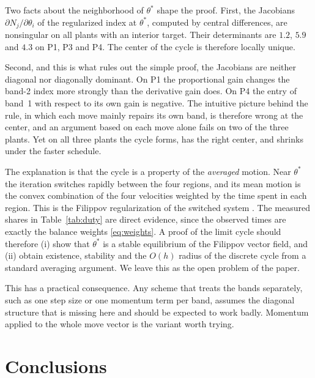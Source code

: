 \documentclass[letterpaper, 10pt, conference, twocolumn]{ieeeconf}
\begin{document}
Two facts about the neighborhood of $\theta^*$ shape the proof. First, the
Jacobians $\partial N_j / \partial \theta_i$ of the regularized index at
$\theta^*$, computed by central differences, are nonsingular on all plants with
an interior target. Their determinants are $1.2$, $5.9$ and $4.3$ on P1, P3 and
P4. The center of the cycle is therefore locally unique.

Second, and this is what rules out the simple proof, the Jacobians are
neither diagonal nor diagonally dominant. On P1 the proportional gain changes
the band-2 index more strongly than the derivative gain does. On P4 the entry
of band~1 with respect to its own gain is negative. The intuitive picture
behind the rule, in which each move mainly repairs its own band, is therefore
wrong at the center, and an argument based on each move alone fails on two of
the three plants. Yet on all three plants the cycle forms, has the right
center, and shrinks under the faster schedule.

The explanation is that the cycle is a property of the \emph{averaged}
motion. Near $\theta^*$ the iteration switches rapidly between the four
regions, and its mean motion is the convex combination of the four velocities
weighted by the time spent in each region. This is the Filippov regularization
of the switched system \cite{Filippov1988}. The measured shares in
Table~\ref{tab:duty} are direct evidence, since the observed times are exactly
the balance weights \eqref{eq:weights}. A proof of the limit cycle should
therefore (i) show that $\theta^*$ is a stable equilibrium of the Filippov
vector field, and (ii) obtain existence, stability and the $O(h)$ radius of the
discrete cycle from a standard averaging argument. We leave this as the open
problem of the paper.

This has a practical consequence. Any scheme that treats the bands separately,
such as one step size or one momentum term per band, assumes the diagonal
structure that is missing here and should be expected to work badly. Momentum
applied to the whole move vector is the variant worth trying.

\section{Conclusions}
\end{document}
